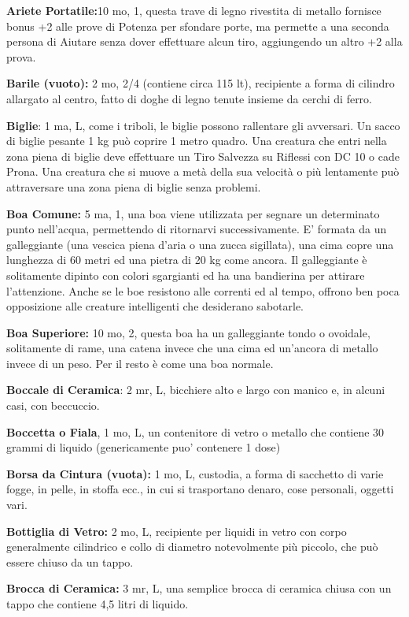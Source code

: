 \documentclass[a4paper,11pt,twoside,openany]{book}
\begin{document}
\textbf{Ariete Portatile:}10 mo, 1, questa trave di legno rivestita di metallo fornisce bonus +2 alle prove di Potenza per sfondare porte, ma permette a una seconda persona di Aiutare senza dover effettuare alcun tiro, aggiungendo un altro +2 alla prova.

\textbf{Barile (vuoto):} 2 mo, 2/4 (contiene circa 115 lt), recipiente a forma di cilindro allargato al centro, fatto di doghe di legno tenute insieme da cerchi di ferro.

\textbf{Biglie}: 1 ma, L, come i triboli, le biglie possono rallentare gli avversari. Un sacco di biglie pesante 1 kg può coprire 1 metro quadro. Una creatura che entri nella zona piena di biglie deve effettuare un Tiro Salvezza su Riflessi con DC 10 o cade Prona. Una creatura che si muove a metà della sua velocità o più lentamente può attraversare una zona piena di biglie senza problemi.

\textbf{Boa Comune:} 5 ma, 1, una boa viene utilizzata per segnare un determinato punto nell'acqua, permettendo di ritornarvi successivamente. E' formata da un galleggiante (una vescica piena d'aria o una zucca sigillata), una cima copre una lunghezza di 60 metri ed una pietra di 20 kg come ancora. Il galleggiante è solitamente dipinto con colori sgargianti ed ha una bandierina per attirare l'attenzione. Anche se le boe resistono alle correnti ed al tempo, offrono ben poca opposizione alle creature intelligenti che desiderano sabotarle.

\textbf{Boa Superiore:} 10 mo, 2, questa boa ha un galleggiante tondo o ovoidale, solitamente di rame, una catena invece che una cima ed un'ancora di metallo invece di un peso. Per il resto è come una boa normale.

\textbf{Boccale di Ceramica}: 2 mr, L, bicchiere alto e largo con manico e, in alcuni casi, con beccuccio.

\textbf{Boccetta o Fiala}, 1 mo, L, un contenitore di vetro o metallo che contiene 30 grammi di liquido (genericamente puo' contenere 1 dose)

\textbf{Borsa da Cintura (vuota):} 1 mo, L, custodia, a forma di sacchetto di varie fogge, in pelle, in stoffa ecc., in cui si trasportano denaro, cose personali, oggetti vari.

\textbf{Bottiglia di Vetro:} 2 mo, L, recipiente per liquidi in vetro con corpo generalmente cilindrico e collo di diametro notevolmente più piccolo, che può essere chiuso da un tappo.

\textbf{Brocca di Ceramica:} 3 mr, L, una semplice brocca di ceramica chiusa con un tappo che contiene 4,5 litri di liquido.
\end{document}
